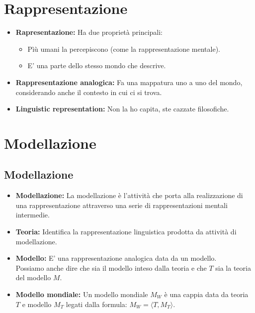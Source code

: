\documentclass{book}
\begin{document}
    \section{Rappresentazione}
    \begin{itemize}
        \item \textbf{Rapresentazione:} Ha due proprietà principali:
            \begin{itemize}
                \item Pìù umani la percepiscono (come la rappresentazione mentale).
                \item E' una parte dello stesso mondo che descrive.
            \end{itemize}
        \item \textbf{Rappresentazione analogica:} Fa una mappatura uno a uno del mondo, considerando anche il contesto in cui ci si trova.
        \item \textbf{Linguistic representation:} Non la ho capita, ste cazzate filosofiche.
    \end{itemize}

    \section{Modellazione}
    \subsection{Modellazione}
    \begin{itemize}
        \item \textbf{Modellazione:} La modellazione è l'attività che porta alla realizzazione di una rappresentazione attraverso una serie di rappresentazioni mentali intermedie.
        \item \textbf{Teoria:} Identifica la rappresentazione linguistica prodotta da attività di modellazione.
        \item \textbf{Modello:} E' una rappresentazione analogica data da un modello.\\
            Possiamo anche dire che sia il modello inteso dalla teoria e che $T$ sia la teoria del modello $M$.
        \item \textbf{Modello mondiale:} Un modello mondiale $M_W$ è una cappia data da teoria $T$ e modello $M_T$ legati dalla formula: $M_W=\langle T, M_T \rangle$.
        \end{itemize}
\end{document}

